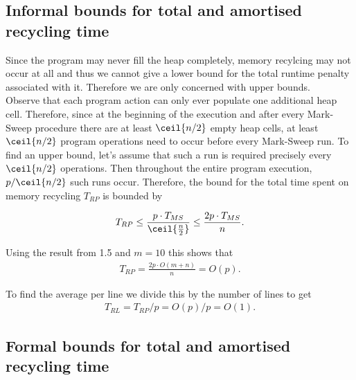 \documentclass{article}
\begin{document}
\subsection{Informal bounds for total and amortised recycling time}

Since the program may never fill the heap completely, memory recylcing may not occur
at all and thus we cannot give a lower bound for the total runtime penalty associated
with it. Therefore we are only concerned with upper bounds.\\
Observe that each program action can only ever populate one additional heap cell.
Therefore, since at the beginning of the execution and after every Mark-Sweep
procedure there are at least $\ceil{n/2}$ empty heap cells, at least $\ceil{n/2}$ program operations
need to occur before every Mark-Sweep run. To find an upper bound, let's assume that
such a run is required precisely every $\ceil{n/2}$ operations. Then throughout the
entire program execution, $p/\ceil{n/2}$ such runs occur. Therefore, the bound
for the total time spent on memory recycling $T_{RP}$ is bounded by

\begin{align*}
	T_{RP} \leq \frac{p\cdot T_{MS}}{\ceil{\frac{n}{2}}} \leq \frac{2p\cdot T_{MS}}{n}.
\end{align*}

Using the result from 1.5 and $m=10$ this shows that
\begin{align*}
	T_{RP} = \frac{2p\cdot O(m+n)}{n} = O(p).
\end{align*}

To find the average per line we divide this by the number of lines to get
\begin{align*}
	T_{RL} = T_{RP}/p = O(p)/p = O(1).
\end{align*}


\subsection{Formal bounds for total and amortised recycling time}
\end{document}
